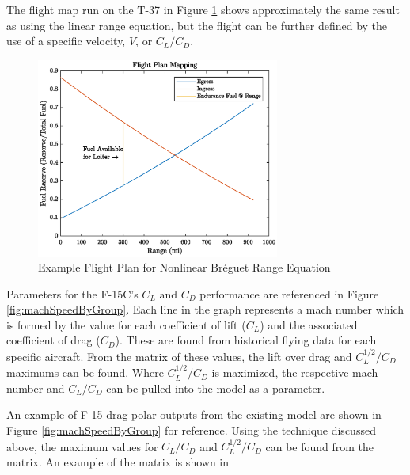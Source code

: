 The flight map run on the T-37 in Figure \ref{fig:NLFlightPlanT37} shows approximately the same result as using the linear range equation, but the flight can be further defined by the use of a specific velocity, $V$, or $C_L/C_D$.
\begin{figure}
    \centering
    \includegraphics[width = 8cm]{Thesis/Method/NLFlightPlanT37.eps}
    \caption{Example Flight Plan for Nonlinear Br\'eguet Range Equation}
    \label{fig:NLFlightPlanT37}
\end{figure}
\par
Parameters for the F-15C's $C_L\text{ and }C_D$ performance are referenced in Figure \ref{fig:machSpeedByGroup}. Each line in the graph represents a mach number which is formed by the value for each coefficient of lift ($C_L$) and the associated coefficient of drag ($C_D$). These are found from historical flying data for each specific aircraft. From the matrix of these values, the lift over drag and $C_L^{1/2}/C_D$ maximums can be found. Where $C_L^{1/2}/C_D$ is maximized, the respective mach number and $C_L/C_D$ can be pulled into the model as a parameter.\par
An example of F-15 drag polar outputs from the existing model are shown in Figure \ref{fig:machSpeedByGroup} for reference. Using the technique discussed above, the maximum values for $C_L/C_D$ and $C_L^{1/2}/C_D$ can be found from the matrix. An example of the matrix is shown in 

